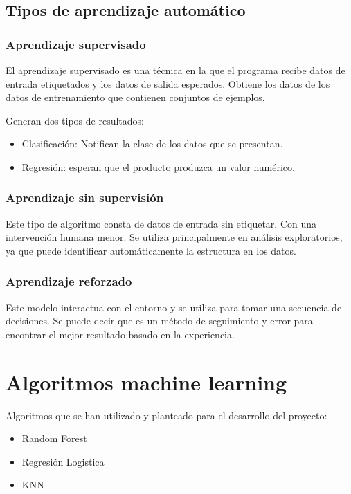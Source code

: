 \subsection{Tipos de aprendizaje automático}

\subsubsection{Aprendizaje supervisado}

El aprendizaje supervisado es una técnica en la que el programa recibe datos de entrada etiquetados y los datos de salida esperados. Obtiene los datos de los datos de entrenamiento que contienen conjuntos de ejemplos. 

Generan dos tipos de resultados:
\begin{itemize}
\item Clasificación: Notifican la clase de los datos que se presentan.
\item Regresión: esperan que el producto produzca un valor numérico.
\end{itemize}
 
\subsubsection{Aprendizaje sin supervisión}

Este tipo de algoritmo consta de datos de entrada sin etiquetar. Con una intervención humana menor. Se utiliza principalmente en análisis exploratorios, ya que puede identificar automáticamente la estructura en los datos.

\subsubsection{Aprendizaje reforzado}

Este modelo interactua con el entorno y se utiliza para tomar una secuencia de decisiones. Se puede decir que es un método de seguimiento y error para encontrar el mejor resultado basado en la experiencia.

\section{Algoritmos machine learning}

Algoritmos que se han utilizado y planteado para el desarrollo del proyecto:

\begin{itemize}
\item Random Forest
\item Regresión Logistica
\item KNN
\end{itemize}

